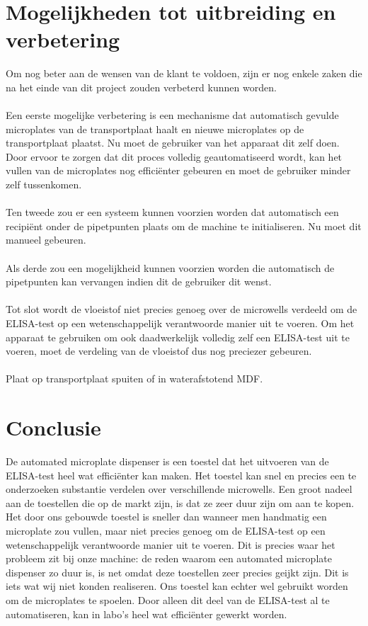 \documentclass[a4paper,twoside,kulak]{kulakreport} %
\begin{document}
\chapter{Mogelijkheden tot uitbreiding en verbetering}

Om nog beter aan de wensen van de klant te voldoen, zijn er nog enkele zaken die na het einde van dit project zouden verbeterd kunnen worden. \\ \\
Een eerste mogelijke verbetering is een mechanisme dat automatisch gevulde microplates  van de transportplaat haalt en nieuwe microplates op de transportplaat plaatst. Nu moet de gebruiker van het apparaat dit zelf doen. Door ervoor te zorgen dat dit proces volledig geautomatiseerd wordt, kan het vullen van de microplates nog efficiënter gebeuren en moet de gebruiker minder zelf tussenkomen. \\ \\
Ten tweede zou er een systeem kunnen voorzien worden dat automatisch een recipiënt onder de pipetpunten plaats om de machine te initialiseren. Nu moet dit manueel gebeuren. \\ \\
Als derde zou een mogelijkheid kunnen voorzien worden die automatisch de pipetpunten kan vervangen indien dit de gebruiker dit wenst. \\ \\

Tot slot wordt de vloeistof niet precies genoeg over de microwells verdeeld om de ELISA-test op een wetenschappelijk verantwoorde manier uit te voeren. Om het apparaat te gebruiken om ook daadwerkelijk volledig zelf een ELISA-test uit te voeren, moet de verdeling van de vloeistof dus nog preciezer gebeuren. 
\\ \\
Plaat op transportplaat spuiten of in waterafstotend MDF.

\chapter{Conclusie}

De automated microplate dispenser is een toestel dat het uitvoeren van de ELISA-test heel wat efficiënter kan maken. Het toestel kan snel en precies een te onderzoeken substantie verdelen over verschillende microwells. Een groot nadeel aan de toestellen die op de markt zijn, is dat ze zeer duur zijn om aan te kopen. Het door ons gebouwde toestel is sneller dan wanneer men handmatig een microplate zou vullen, maar niet precies genoeg om de ELISA-test op een wetenschappelijk verantwoorde manier uit te voeren. Dit is precies waar het probleem zit bij onze machine: de reden waarom een automated microplate dispenser zo duur is, is net omdat deze toestellen zeer precies geijkt zijn. Dit is iets wat wij niet konden realiseren. Ons toestel kan echter wel gebruikt worden om de microplates te spoelen. Door alleen dit deel van de ELISA-test al te automatiseren, kan in labo's heel wat efficiënter gewerkt worden.
\end{document}
